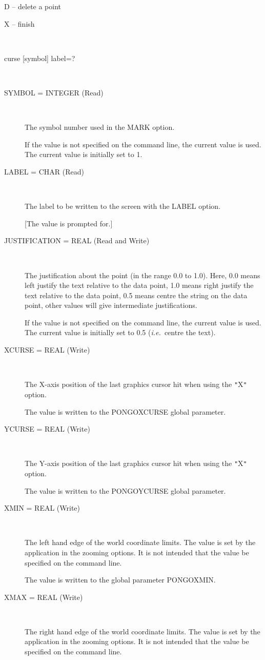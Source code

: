 \documentclass[twoside,11pt]{article}
\renewcommand{\_}{\texttt{\symbol{95}}}
\newcommand{\ie}{{\em i.e.\ }}
\newcommand{\sstusage}[1]{\item[Usage:] \mbox{}
\\[1.3ex]{\raggedright \ssttt #1}}
\newcommand{\sstparameters}[1]{
   \item[Parameters:] \mbox{} \\
   \vspace{-3.5ex}
   \begin{description}
      #1
   \end{description}
}
\newcommand{\sstsubsection}[1]{ \item[{#1}] \mbox{} \\}
\newcommand{\sstitem}{\item}
\newcommand{\sstusage}[1]{\item[Usage:]
      \begin{description}
         {\ssttt #1}
      \end{description}
      \\
   }
\newcommand{\sstparameters}[1]{
      \item[Parameters:] \\
      \begin{description}
         #1
      \end{description}
      \\
   }
\newcommand{\sstsubsection}[1]{\item[{#1}]}
\newcommand{\sstitem}{\item}
\begin{document}
{{{{            \sstitem
                  D -- delete a point

            \sstitem
                  X -- finish
         }
      }
   }
   \sstusage {
      curse [symbol] label=?
   }
   \sstparameters{
      \sstsubsection{
         SYMBOL = \_INTEGER (Read)
      }{
         The symbol number used in the MARK option.

         If the value is not specified on the command line, the current
         value is used. The current value is initially set to 1.
      }
      \sstsubsection{
         LABEL = \_CHAR (Read)
      }{
         The label to be written to the screen with the LABEL option.

         [The value is prompted for.]
      }
      \sstsubsection{
         JUSTIFICATION = \_REAL (Read and Write)
      }{
         The justification about the point (in the range 0.0 to 1.0).
         Here, 0.0 means left justify the text relative to the data
         point, 1.0 means right justify the text relative to the data
         point, 0.5 means centre the string on the data point, other
         values will give intermediate justifications.

         If the value is not specified on the command line, the current
         value is used. The current value is initially set to 0.5 
         (\ie centre the text).
      }
      \sstsubsection{
         XCURSE = \_REAL (Write)
      }{
         The X-axis position of the last graphics cursor hit when using
         the {\tt "}X{\tt "} option.

         The value is written to the PONGO\_XCURSE global parameter.
      }
      \sstsubsection{
         YCURSE = \_REAL (Write)
      }{
         The Y-axis position of the last graphics cursor hit when using
         the {\tt "}X{\tt "} option.

         The value is written to the PONGO\_YCURSE global parameter.
      }
      \sstsubsection{
         XMIN = \_REAL (Write)
      }{
         The left hand edge of the world coordinate limits. The value
         is set by the application in the zooming options. It is not
         intended that the value be specified on the command line.

         The value is written to the global parameter PONGO\_XMIN.
      }
      \sstsubsection{
         XMAX = \_REAL (Write)
      }{
         The right hand edge of the world coordinate limits. The value
         is set by the application in the zooming options. It is not
         intended that the value be specified on the command line.

}}}
\end{document}
